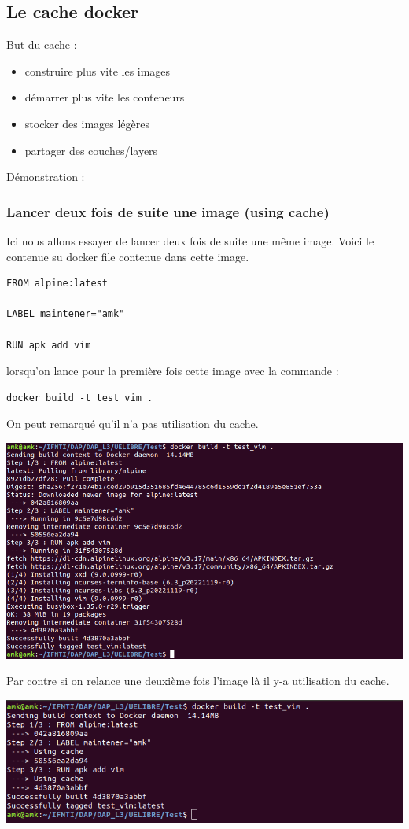 \documentclass[12pt,a4paper]{article}
\begin{document}
\subsection{Le cache docker}
But du cache : 
\begin{itemize}
\item construire plus vite les images
\item démarrer plus vite les conteneurs
\item stocker des images légères
\item partager des couches/layers
\end{itemize}
Démonstration : \\
\subsubsection{Lancer deux fois de suite une image (using cache)}
Ici nous allons essayer de lancer deux fois de suite une même image. Voici 
le contenue su docker file contenue dans cette image.
\begin{verbatim}
FROM alpine:latest

LABEL maintener="amk"

RUN apk add vim
\end{verbatim}
lorsqu'on lance pour la première fois cette image avec la commande :
\begin{verbatim}
docker build -t test_vim .
\end{verbatim}
On peut remarqué qu'il n'a pas utilisation du cache.
\begin{center}
\includegraphics[scale=0.5]{img/test_vim.png}
\end{center}
Par contre si on relance une deuxième fois l'image là il y-a utilisation du cache.
\begin{center}
\includegraphics[scale=0.5]{img/test_vim_cache.png}
\end{center}
\end{document}
